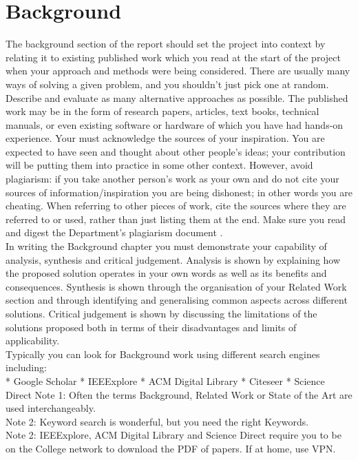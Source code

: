 \documentclass[12pt,twoside]{article}
\begin{document}
\section{Background}
The background section of the report should set the project into context by relating it to existing published work which you read at the start of the project when your approach and methods were being considered. There are usually many ways of solving a given problem, and you shouldn't just pick one at random. Describe and evaluate as many alternative approaches as possible. The published work may be in the form of research papers, articles, text books, technical manuals, or even existing software or hardware of which you have had hands-on experience. Your must acknowledge the sources of your inspiration. You are expected to have seen and thought about other people's ideas; your contribution will be putting them into practice in some other context. However, avoid plagiarism: if you take another person's work as your own and do not cite your sources of information/inspiration you are being dishonest; in other words you are cheating. When referring to other pieces of work, cite the sources where they are referred to or used, rather than just listing them at the end. Make sure you read and digest the Department's plagiarism document .\\
In writing the Background chapter you must demonstrate your capability of analysis, synthesis and critical judgement. Analysis is shown by explaining how the proposed solution operates in your own words as well as its benefits and consequences. Synthesis is shown through the organisation of your Related Work section and through identifying and generalising common aspects across different solutions. Critical judgement is shown by discussing the limitations of the solutions proposed both in terms of their disadvantages and limits of applicability.\\
Typically you can look for Background work using different search engines including:\\
* Google Scholar
* IEEExplore
* ACM Digital Library
* Citeseer
* Science Direct
Note 1: Often the terms Background, Related Work or State of the Art are used interchangeably.\\
Note 2: Keyword search is wonderful, but you need the right Keywords.\\
Note 2: IEEExplore, ACM Digital Library and Science Direct require you to be on the College network to download the PDF of papers. If at home, use VPN.\\
\end{document}
